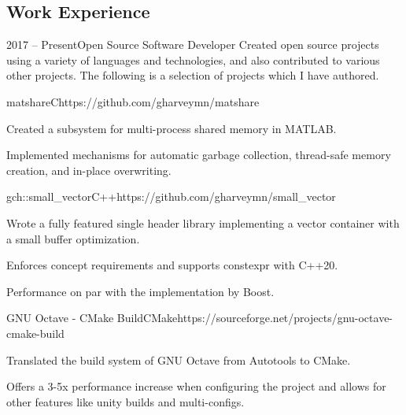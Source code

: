 \documentclass[
  9pt, %
]{FreemanCV}
\begin{document}
\begin{paracol}{2} %


\section{Work Experience}

\begin{jobentry}{2017 -- Present}{}{Open Source Software Developer}
  Created open source projects using a variety of languages and technologies, and also contributed
  to various other projects. The following is a selection of projects which I have authored.

  \begin{description}[
    noitemsep,
    topsep=0pt,
    labelindent=1em,
    leftmargin=*,
    labelsep=0pt,
    rightmargin=1em
  ]
    \item
    \begin{project*}{matshare}{C}{https://github.com/gharveymn/matshare}
      \item Created a subsystem for multi-process shared memory in MATLAB.
      \item Implemented mechanisms for automatic garbage collection, thread-safe
            memory creation, and in-place overwriting.
    \end{project*}

    \item
    \begin{project*}{gch::small\_vector}{C++}{https://github.com/gharveymn/small\_vector}
      \item Wrote a fully featured single header library implementing a vector container with a small buffer optimization.
      \item Enforces concept requirements and supports constexpr with C++20.
      \item Performance on par with the implementation by Boost.
    \end{project*}

    \item
    \begin{project*}{GNU Octave - CMake Build}{CMake}{https://sourceforge.net/projects/gnu-octave-cmake-build}
      \item Translated the build system of GNU Octave from Autotools to CMake.
      \item Offers a 3-5x performance increase when configuring the project
            and allows for other features like unity builds and multi-configs.
    \end{project*}


\end{description}
\end{jobentry}
\end{paracol}
\end{document}
